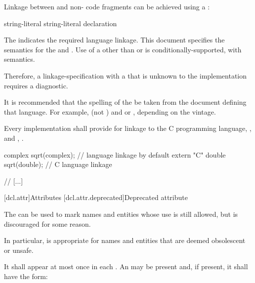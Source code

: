 \documentclass{wg21}
\begin{document}
\pnum
Linkage between \Cpp{} and  non-\Cpp{} code fragments can
be achieved using a :

%
%
%
\begin{bnf}
    \br
     string-literal \terminal{\{}  \terminal{\}}\br
     string-literal declaration
\end{bnf}

The  indicates the required language linkage.
This document specifies the semantics for the
  and . Use of a
 other than  or  is
conditionally-supported, with  semantics.
\begin{note}
    Therefore, a linkage-specification with a  that
    is unknown to the implementation requires a diagnostic.
\end{note}
\begin{note}
    It is recommended that the spelling of the  be
    taken from the document defining that language. For example, 
    (not ) and  or , depending on
    the vintage.
\end{note}

\pnum
{}%
Every implementation shall provide for linkage to the C programming language,
%
, and \Cpp{}, .
\begin{example}
    \begin{codeblock}
        complex sqrt(complex);          // \Cpp{} language linkage by default
        extern "C" {
            double sqrt(double);          // C language linkage
        }
    \end{codeblock}
\end{example}

// [...]

[dcl.attr]{Attributes}%
[dcl.attr.deprecated]{Deprecated attribute}%

\pnum
The   can be used to mark names and entities
whose use is still allowed, but is discouraged for some reason.
\begin{note}
    In particular,
     is appropriate for names and entities that are deemed obsolescent or
    unsafe.
\end{note}
It shall appear at most once in each . An
 may be present and, if present, it shall have the form:
\end{document}
